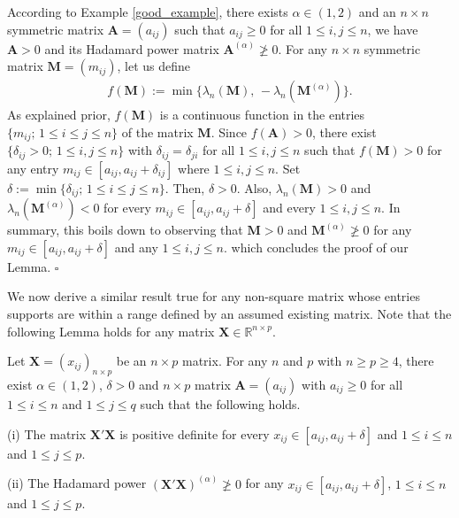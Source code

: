 \documentclass[conference,letterpaper]{IEEEtran}
\numberwithin{equation}{section}
\newcommand{\lbl}{\label}
\newcommand{\beaa}{\begin{eqnarray*}}
\newcommand{\eeaa}{\end{eqnarray*}}
\begin{document}
According to Example \ref{good_example}, there exists  $\alpha\in (1, 2)$ and an $n\times n$ symmetric matrix $\mathbf{A}=(a_{ij})$ such that $a_{ij}\geq 0$ for all $1\leq i, j \leq n$, we have $\mathbf{A}>0$ and its Hadamard power matrix $\mathbf{A}^{(\alpha)} \ngeqslant 0$. 
For any $n\times n$ symmetric matrix  $\mathbf{M}=(m_{ij})$, let us define
\beaa
f(\mathbf{M}):=\min\big\{\lambda_n(\mathbf{M}),\, -\lambda_n(\mathbf{M}^{(\alpha)})\big\}.
\eeaa
As explained prior, $f(\mathbf{M})$ is a continuous function in the entries $\{m_{ij};\, 1\leq i\leq j \leq n\}$ of the matrix $\mathbf{M}$. 
Since $f(\mathbf{A})>0$, there exist $\{\delta_{ij}>0;\, 1\leq i, j\leq n\}$ with $\delta_{ij}=\delta_{ji}$ for all $1\leq i, j\leq n$ such that $f(\mathbf{M})>0$ for any entry $m_{ij}\in [a_{ij}, a_{ij}+\delta_{ij}]$ where $1\leq i, j\leq n$.
Set $\delta := \min\{\delta_{ij};\, 1\leq i\leq j\leq n\}.$ Then, $\delta>0$. Also, $\lambda_n(\mathbf{M})>0$ and $\lambda_n(\mathbf{M}^{(\alpha)})<0$ for every $m_{ij}\in [a_{ij}, a_{ij}+\delta]$ and every $1\leq i, j\leq n.$ 
In summary, this boils down to observing that $\mathbf{M}>0$  and $\mathbf{M}^{(\alpha)} \ngeqslant 0$ for any $m_{ij}\in [a_{ij}, a_{ij}+\delta]$ and any $1\leq i, j\leq n.$ which concludes the proof of our Lemma.
\hfill$\square$
\medskip


We now derive a similar result true for any non-square matrix whose entries supports are within a range defined by an assumed existing matrix.
Note that the following Lemma holds for any matrix $\mathbf{X} \in \mathbb{R}^{n \times p}$.
\begin{lem}\lbl{lemma:lem2} Let $\mathbf{X}=(x_{ij})_{n\times p}$ be an $n\times p$ matrix. For any $n$ and $p$ with $n\geq p\geq 4$, there exist $\alpha\in (1,2)$, $\delta>0$ and $n\times p$ matrix  $\mathbf{A}=(a_{ij})$ with $a_{ij}\geq 0$ for all $1\leq i\leq n$ and $1\leq  j \leq q$ such that the following holds.

(i)  The matrix $\mathbf{X}'\mathbf{X}$ is positive definite for every $x_{ij}\in [a_{ij}, a_{ij}+\delta]$ and $1\leq i\leq n$ and $1\leq j \leq p.$

(ii) The Hadamard power $(\mathbf{X}'\mathbf{X})^{(\alpha)}\ngeqslant 0$  for any $x_{ij}\in [a_{ij}, a_{ij}+\delta]$, $1\leq i\leq n$ and $1\leq j \leq p$.
\end{lem}
\medskip
\end{document}
